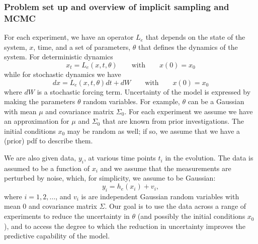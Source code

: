 \documentclass[11pt]{article}
\begin{document}
\subsubsection*{Problem set up and overview of implicit sampling and MCMC}
For each experiment,  we have an operator $L_e$ that depends on the state of the system, $x$, time,
and a set of parameters, $\theta$ that defines the dynamics of the system. For deterministic 
dynamics
\begin{equation}
\label{eq:ModelEquation}
x_t = L_e(x,t,\theta) \qquad \mathrm{with} \qquad x(0) = x_0
\end{equation}
while for stochastic dynamics we have
\begin{equation}
\label{eq:ModelEquationSt}
dx = L_e(x,t,\theta) dt + dW \qquad \mathrm{with} \qquad x(0) = x_0
\end{equation}
where $dW$ is a stochastic forcing term. 
Uncertainty of the model is expressed by making the parameters $\theta$ random variables.
For example, $\theta$ can be a Gaussian with mean $\mu$ and covariance matrix $\Sigma_0$.
For each experiment we 
assume we have an approximation for $\mu$ and $\Sigma_0$ that are known from prior investigations.
The initial conditions $x_0$ may be random as well; if so, we assume that we have a (prior) pdf to describe them.

We are also given data, $y_i$, at various time points $t_i$ in the evolution.
The data is assumed to be a function of $x_i$ and
we assume that the measurements are perturbed by noise, which, for simplicity, we assume to be Gaussian:
\begin{equation}
	\label{eq:DataEquation}
	y_i = h_e(x_i)+v_i,
\end{equation}
where $i=1,2,\dots$, and $v_i$ is are independent Gaussian random variables with mean $0$ and covariance matrix $\Sigma$.
Our goal is to use the data across a range of experiments to reduce the uncertainty in $\theta$
(and possibly the initial conditions $x_0$), and to 
access the degree to which the reduction in uncertainty improves the predictive capability of the model.
\end{document}
